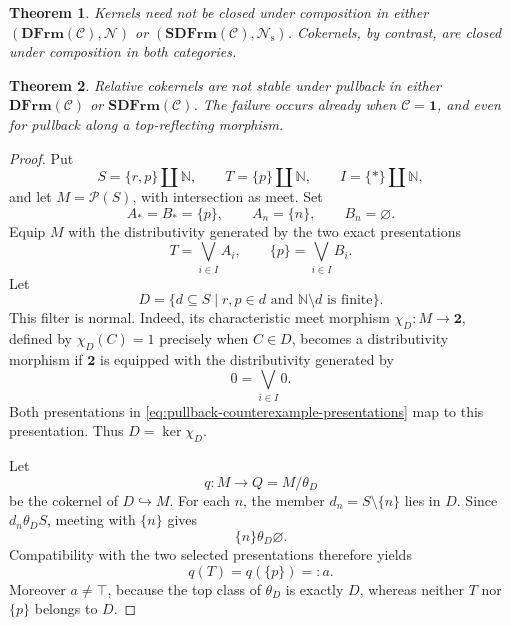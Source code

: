 \documentclass[10pt,a4paper]{amsart}
\newtheorem{theorem}{Theorem}
\newcommand{\C}{\mathcal C}
\newcommand{\DFrm}{\mathbf{DFrm}}
\newcommand{\Null}{\mathcal N}
\newcommand{\SDFrm}{\mathbf{SDFrm}}
\begin{document}
\begin{theorem}\label{thm:composition-normal-maps}
Kernels need not be closed under composition in either
\((\DFrm(\C),\Null)\) or \((\SDFrm(\C),\Null_{\mathrm s})\).  Cokernels,
by contrast, are closed under composition in both categories.
\end{theorem}

\begin{theorem}\label{thm:cokernels-not-pullback-stable}
Relative cokernels are not stable under pullback in either
\(\DFrm(\C)\) or \(\SDFrm(\C)\).  The failure occurs already when
\(\C=\mathbf1\), and even for pullback along a top-reflecting morphism.
\end{theorem}

\begin{proof}
Put
\[
 S=\{r,p\}\amalg\mathbb N,\qquad
 T=\{p\}\amalg\mathbb N,\qquad
 I=\{*\}\amalg\mathbb N,
\]
and let \(M=\mathcal P(S)\), with intersection as meet.  Set
\[
 A_* = B_*=\{p\},\qquad A_n=\{n\},\qquad B_n=\varnothing .
\]
Equip \(M\) with the distributivity generated by the two exact
presentations
\begin{equation}\label{eq:pullback-counterexample-presentations}
                    T=\bigvee_{i\in I}A_i,
             \qquad \{p\}=\bigvee_{i\in I}B_i .
\end{equation}
Let
\[
 D=\{d\subseteq S\mid r,p\in d\text{ and }
                     \mathbb N\setminus d\text{ is finite}\}.
\]
This filter is normal.  Indeed, its characteristic meet morphism
\(\chi_D:M\to\mathbf2\), defined by \(\chi_D(C)=1\) precisely when
\(C\in D\), becomes a distributivity morphism if \(\mathbf2\) is
equipped with the distributivity generated by
\[
                          0=\bigvee_{i\in I}0.
\]
Both presentations in
\eqref{eq:pullback-counterexample-presentations} map to this
presentation.  Thus \(D=\ker\chi_D\).

Let
\[
                    q:M\longrightarrow Q=M/\theta_D
\]
be the cokernel of \(D\hookrightarrow M\).  For each \(n\), the member
\(d_n=S\setminus\{n\}\) lies in \(D\).  Since
\(d_n\mathrel{\theta_D}S\), meeting with \(\{n\}\) gives
\[
                     \{n\}\mathrel{\theta_D}\varnothing .
\]
Compatibility with the two selected presentations therefore yields
\[
                     q(T)=q(\{p\})=:a.
\]
Moreover \(a\neq\top\), because the top class of \(\theta_D\) is
exactly \(D\), whereas neither \(T\) nor \(\{p\}\) belongs to \(D\).


\end{proof}
\end{document}
